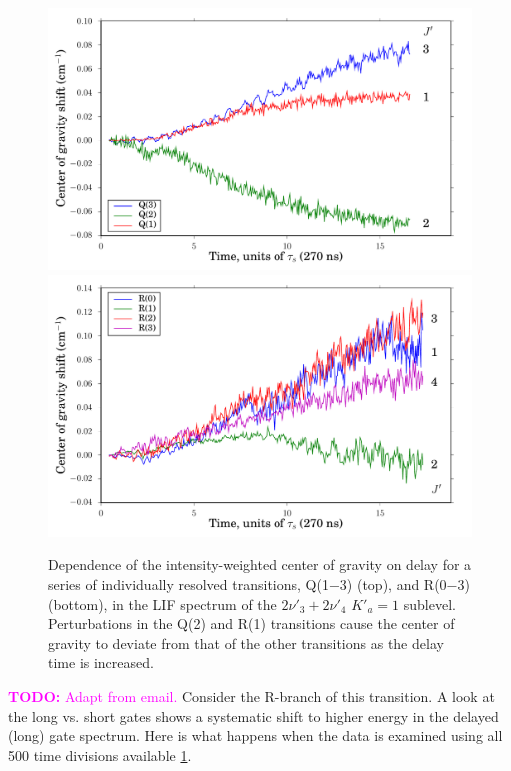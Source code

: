\documentclass[12pt]{mitthesis}
\newcommand{\TODO} [1]{\textcolor{magenta}{\textbf{TODO:} #1}}
\begin{document}
\begin{figure}
  \caption{Dependence of the intensity-weighted center of gravity on
    delay for a series of individually resolved transitions, Q(1$-$3)
    (top), and R(0$-$3) (bottom), in the LIF spectrum of the
    $2\nu'_3+2\nu'_4$ $K'_a\!=\!1$ sublevel.  Perturbations in the
    Q(2) and R(1) transitions cause the center of gravity to deviate
    from that of the other transitions as the delay time is increased.}
  \label{fig:32b2-cog-delay}
  \centering
  \vspace{5mm}
  \includegraphics[width=6in]{32b2-q123-cog-delay.pdf}
  \includegraphics[width=6in]{32b2-r0123-cog-delay.pdf}
\end{figure}




\TODO{Adapt from email.}  Consider the R-branch of this transition.  A
look at the long vs. short gates shows a systematic shift to higher
energy in the delayed (long) gate spectrum.  Here is what happens when
the data is examined using all 500 time divisions available
\ref{fig:32b2-cog-delay}.
\end{document}

